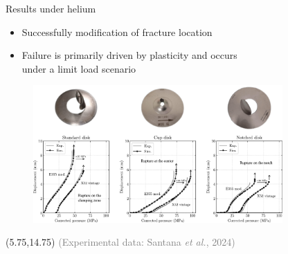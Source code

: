 \documentclass[9pt]{beamer}
\begin{document}
\begin{frame}{Results under helium}

\begin{itemize}
	\item Successfully modification of fracture location
	\vspace{0.15cm}
	\item Failure is primarily driven by plasticity and occurs \\ under a limit load scenario
\end{itemize}

\vspace{0.15cm}

\begin{figure}
	\centering
	\includegraphics[width=0.85\textwidth]{Images/disks_helium.pdf} \\
\end{figure}

    
    \begin{textblock}{6}(5.75,14.75)
        \textcolor{gray}{\scriptsize (Experimental data: Santana \textit{et al.}, 2024)}
    \end{textblock}

\end{frame}

\end{document}
